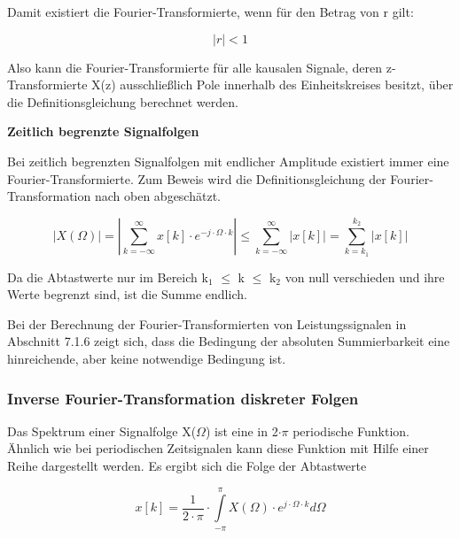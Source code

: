 \noindent Damit existiert die Fourier-Transformierte, wenn f\"{u}r den Betrag von r gilt:

\begin{equation}\label{eq:seventhirtythree}
\left|r\right|<1
\end{equation}

\noindent Also kann die Fourier-Transformierte f\"{u}r alle kausalen Signale, deren z-Transformierte X(z) ausschlie{\ss}lich Pole innerhalb des Einheitskreises besitzt, \"{u}ber die Definitionsgleichung berechnet werden.\bigskip

{\selectfont
\noindent\textbf{Zeitlich begrenzte Signalfolgen}}\smallskip

\noindent Bei zeitlich begrenzten Signalfolgen mit endlicher Amplitude existiert immer eine Fourier-Transformierte. Zum Beweis wird die Definitionsgleichung der Fourier-Transformation nach oben abgesch\"{a}tzt.

\begin{equation}\label{eq:seventhirtyfour}
\left|X\left(\Omega \right)\right|=\left|\sum _{k=-\infty }^{\infty }x\left[k\right]\cdot e^{-j\cdot \Omega \cdot k}  \right|\le \sum _{k=-\infty }^{\infty }\left|x\left[k\right]\right| =\sum _{k=k_{1} }^{k_{2} }\left|x\left[k\right]\right|
\end{equation}

\noindent Da die Abtastwerte nur im Bereich k${}_{1}$ $\leq$ k $\leq$ k${}_{2}$ von null verschieden und ihre Werte begrenzt sind, ist die Summe endlich. 

\noindent Bei der Berechnung der Fourier-Transformierten von Leistungssignalen in Abschnitt 7.1.6 zeigt sich, dass die Bedingung der absoluten Summierbarkeit eine hinreichende, aber keine notwendige Bedingung ist. 

\subsubsection{Inverse Fourier-Transformation diskreter Folgen}

\noindent Das Spektrum einer Signalfolge X($\Omega$) ist eine in 2$\cdot\pi$ periodische Funktion. \"{A}hnlich wie bei periodischen Zeitsignalen kann diese Funktion mit Hilfe einer Reihe dargestellt werden. Es ergibt sich die Folge der Abtastwerte 

\begin{equation}\label{eq:seventhirtyfive}
x\left[k\right]=\frac{1}{2\cdot \pi } \cdot \int\limits _{-\pi }^{\pi }X\left(\Omega \right)\cdot e^{j\cdot \Omega \cdot k}d\Omega
\end{equation}


